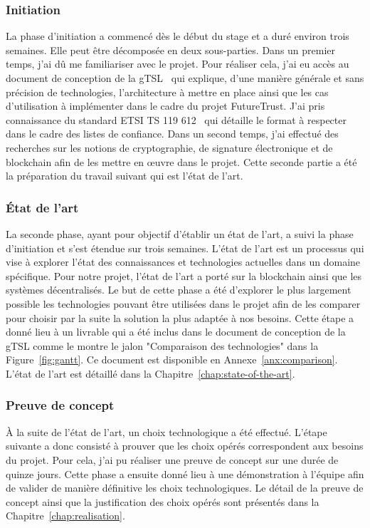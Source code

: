 \documentclass{tnreport}
\begin{document}
\subsubsection{Initiation}

La phase d'initiation a commencé dès le début du stage et a duré environ trois semaines. 
Elle peut être décomposée en deux sous-parties. Dans un premier temps, j'ai dû me familiariser avec le projet. Pour réaliser cela, j'ai eu accès au document de conception de la gTSL~\cite{design-document} qui explique, d'une manière générale et sans précision de technologies, l'architecture à mettre en place ainsi que les cas d'utilisation à implémenter dans le cadre du projet FutureTrust. J'ai pris connaissance du standard ETSI TS 119 612~\cite{ETSITS119612} qui détaille le format à respecter dans le cadre des listes de confiance. Dans un second temps, j'ai effectué des recherches sur les notions de cryptographie, de signature électronique et de blockchain afin de les mettre en œuvre dans le projet. Cette seconde partie a été la préparation du travail suivant qui est l'état de l'art.

\subsubsection{État de l'art}

La seconde phase, ayant pour objectif d'établir un état de l'art, a suivi la phase d'initiation et s'est étendue sur trois semaines.
L'état de l'art est un processus qui vise à explorer l'état des connaissances et technologies actuelles dans un domaine spécifique. Pour notre projet, l'état de l'art a porté sur la blockchain ainsi que les systèmes  décentralisés. Le but de cette phase a été d'explorer le plus largement possible les technologies pouvant être utilisées dans le projet afin de les comparer pour choisir par la suite la solution la plus adaptée à nos besoins. Cette étape a donné lieu à un livrable qui a été inclus dans le document de conception de la gTSL comme le montre le jalon "Comparaison des technologies" dans la Figure~\ref{fig:gantt}. Ce document est disponible en Annexe~\ref{anx:comparison}. L'état de l'art est détaillé dans la Chapitre~\ref{chap:state-of-the-art}.

\subsubsection{Preuve de concept}

À la suite de l'état de l'art, un choix technologique a été effectué. L'étape suivante a donc consisté à prouver que les choix opérés correspondent aux besoins du projet. Pour cela, j'ai pu réaliser une preuve de concept sur une durée de quinze jours. Cette phase a ensuite donné lieu à une démonstration à l'équipe afin de valider de manière définitive les choix technologiques. Le détail de la preuve de concept ainsi que la justification des choix opérés sont présentés dans la Chapitre~\ref{chap:realisation}.
\end{document}
